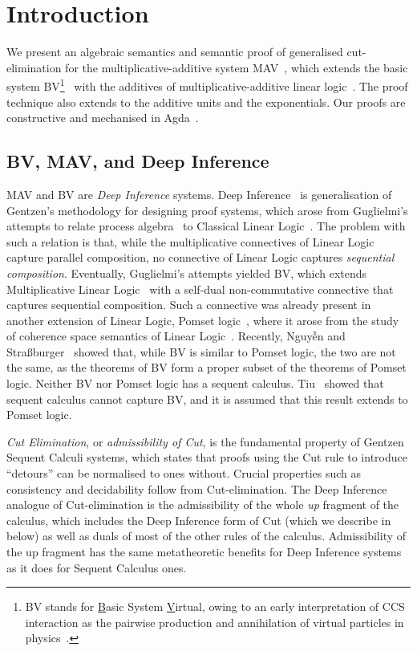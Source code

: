 \section{Introduction}\label{sec:introduction}

We present an algebraic semantics and semantic proof of generalised cut-elimination for the multiplicative-additive system MAV~\cite{Horne15:mav}, which extends the basic system BV\footnote{
      BV stands for \underline{B}asic System \underline{V}irtual, owing to an early interpretation of CCS interaction as the pairwise production and annihilation of virtual particles in physics~\cite[]{Horne15:mav}.
}~\cite{Guglielmi99:bv,Guglielmi07:sis} with the additives of multiplicative-additive linear logic~\cite[MALL]{Girard87:ll}. The proof technique also extends to the additive units and the exponentials.
Our proofs are constructive and mechanised in Agda~\cite{Agda264}.

\subsection{BV, MAV, and Deep Inference}

MAV and BV are \emph{Deep Inference} systems. Deep Inference~\cite{Guglielmi14:di} is generalisation of Gentzen's methodology for designing proof systems, which arose from Guglielmi's attempts to relate process algebra~\cite[CCS]{Milner80:CCS,Milner89:CC} to Classical Linear Logic~\cite[CLL]{Girard87:ll}.
The problem with such a relation is that, while the multiplicative connectives of Linear Logic capture parallel composition, no connective of Linear Logic captures \emph{sequential composition}.
Eventually, Guglielmi's attempts yielded BV, which extends Multiplicative Linear Logic~\cite[MLL]{Girard87:ll} with a self-dual non-commutative connective that captures sequential composition.
Such a connective was already present in another extension of Linear Logic, Pomset logic~\cite{Retore97:pomset}, where it arose from the study of coherence space semantics of Linear Logic~\cite[]{GirardTL89:proofs}.
Recently, Nguyễn and Stra{\ss}burger~\cite{NguyenS22:bvisnotpl,NguyenS23:complexity} showed that, while BV is similar to Pomset logic, the two are not the same, as the theorems of BV form a proper subset of the theorems of Pomset logic.
Neither BV nor Pomset logic has a sequent calculus. Tiu~\cite{Tiu06:sisii} showed that sequent calculus cannot capture BV, and it is assumed that this result extends to Pomset logic.

\emph{Cut Elimination}, or \emph{admissibility of Cut}, is the fundamental property of Gentzen Sequent Calculi systems, which states that proofs using the Cut rule to introduce ``detours'' can be normalised to ones without. Crucial properties such as consistency and decidability follow from Cut-elimination. The Deep Inference analogue of Cut-elimination is the admissibility of the whole \emph{up} fragment of the calculus, which includes the Deep Inference form of Cut (which we describe in  below) as well as duals of most of the other rules of the calculus. Admissibility of the up fragment has the same metatheoretic benefits for Deep Inference systems as it does for Sequent Calculus ones.

